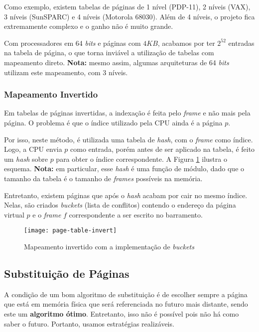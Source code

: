 Como exemplo, existem tabelas de páginas de 1 nível (PDP-11), 2 níveis (VAX), 3 níveis (SunSPARC) e 4 níveis (Motorola 68030). Além de 4 níveis, o projeto fica extremamente complexo e o ganho não é muito grande.

Com processadores em 64 \textit{bits} e páginas com $4KB$, acabamos por ter $2^{52}$ entradas na tabela de página, o que torna inviável a utilização de tabelas com mapeamento direto. \textbf{Nota:} mesmo assim, algumas arquiteturas de 64 \textit{bits} utilizam este mapeamento, com 3 níveis.



\subsubsection{Mapeamento Invertido}
Em tabelas de páginas invertidas, a indexação é feita pelo \textit{frame} e não mais pela página. O problema é que o índice utilizado pela CPU ainda é a página $p$.

Por isso, neste método, é utilizada uma tabela de \textit{hash}, com o \textit{frame} como índice. Logo, a CPU envia $p$ como entrada, porém antes de ser aplicado na tabela, é feito um \textit{hash} sobre $p$ para obter o índice correspondente. A Figura \ref{fig:page-table-invert} ilustra o esquema. \textbf{Nota:} em particular, esse \textit{hash} é uma função de módulo, dado que o tamanho da tabela é o tamanho de \textit{frames} possíveis na memória.

Entretanto, existem páginas que após o \textit{hash} acabam por cair no mesmo índice. Nelas, são criados \textit{buckets} (lista de conflitos) contendo o endereço da página virtual $p$ e o \textit{frame} $f$ correspondente a ser escrito no barramento.

\begin{figure}
  \centering
  \texttt{[image: page-table-invert]}
  \caption{Mapeamento invertido com a implementação de \textit{buckets}}
  \label{fig:page-table-invert}
\end{figure}










\subsection{Substituição de Páginas}
A condição de um bom algoritmo de substituição é de escolher sempre a página que está em memória física que será referenciada no futuro mais distante, sendo este um \textbf{algoritmo ótimo}. Entretanto, isso não é possível pois não há como saber o futuro. Portanto, usamos estratégias realizáveis.

